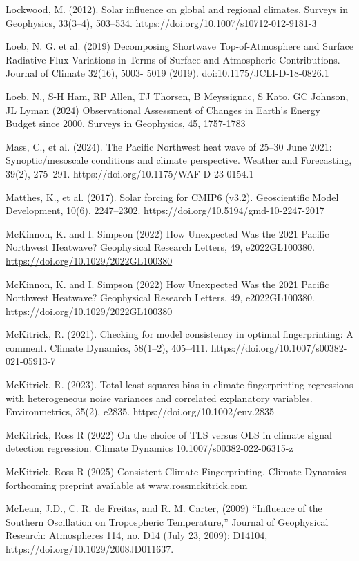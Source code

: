 \documentclass[12pt,paper=a4,DIV=12,parskip=never,chapterprefix=false,headings=standardclasses]{scrreprt}
\begin{document}
Lockwood, M. (2012). Solar influence on global and regional climates. Surveys in Geophysics, 33(3–4),
503–534. https://doi.org/10.1007/s10712-012-9181-3

Loeb, N. G. et al. (2019) Decomposing Shortwave Top-of-Atmosphere and Surface Radiative Flux
Variations in Terms of Surface and Atmospheric Contributions. Journal of Climate 32(16), 5003-
5019 (2019). doi:10.1175/JCLI-D-18-0826.1

Loeb, N., S-H Ham, RP Allen, TJ Thorsen, B Meyssignac, S Kato, GC Johnson, JL Lyman (2024)
Observational Assessment of Changes in Earth’s Energy Budget since 2000. Surveys in Geophysics,
45, 1757-1783

Mass, C., et al. (2024). The Pacific Northwest heat wave of 25–30 June 2021: Synoptic/mesoscale
conditions and climate perspective. Weather and Forecasting, 39(2), 275–291.
https://doi.org/10.1175/WAF-D-23-0154.1

Matthes, K., et al. (2017). Solar forcing for CMIP6 (v3.2). Geoscientific Model Development, 10(6),
2247–2302. https://doi.org/10.5194/gmd-10-2247-2017

McKinnon, K. and I. Simpson (2022) How Unexpected Was the 2021 Pacific Northwest Heatwave?
Geophysical Research Letters, 49, e2022GL100380. \url{https://doi.org/10.1029/2022GL100380}

McKinnon, K. and I. Simpson (2022) How Unexpected Was the 2021 Pacific Northwest Heatwave?
Geophysical Research Letters, 49, e2022GL100380. \url{https://doi.org/10.1029/2022GL100380}

McKitrick, R. (2021). Checking for model consistency in optimal fingerprinting: A comment. Climate
Dynamics, 58(1–2), 405–411. https://doi.org/10.1007/s00382-021-05913-7

McKitrick, R. (2023). Total least squares bias in climate fingerprinting regressions with heterogeneous
noise variances and correlated explanatory variables. Environmetrics, 35(2), e2835.
https://doi.org/10.1002/env.2835

McKitrick, Ross R (2022) On the choice of TLS versus OLS in climate signal detection
regression. Climate Dynamics 10.1007/s00382-022-06315-z

McKitrick, Ross R (2025) Consistent Climate Fingerprinting. Climate Dynamics forthcoming preprint
available at www.rossmckitrick.com

McLean, J.D., C. R. de Freitas, and R. M. Carter, (2009) “Influence of the Southern Oscillation on
Tropospheric Temperature,” Journal of Geophysical Research: Atmospheres 114, no. D14 (July 23,
2009): D14104, https://doi.org/10.1029/2008JD011637.
\end{document}
